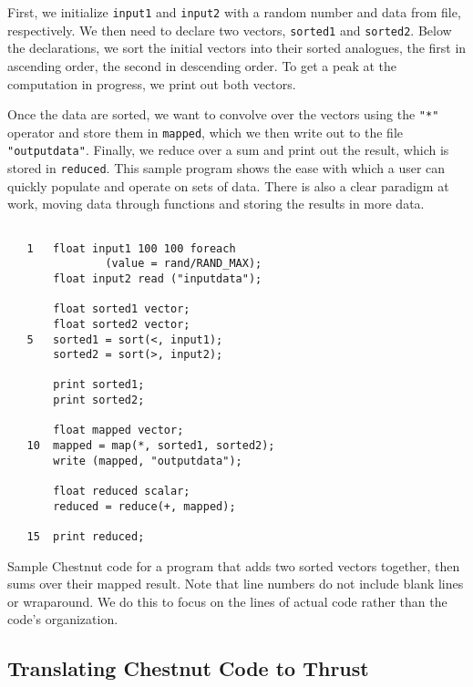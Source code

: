 \documentclass[twocolumn]{article}
\renewcommand{\|}{\origbar} %
\newcommand{\code}[1]{\texttt{#1}}
\begin{document}
First, we initialize \code{input1} and \code{input2} with a random number and data from file, respectively. We then need to declare two vectors, \code{sorted1} and \code{sorted2}. Below the declarations, we sort the initial vectors into their sorted analogues, the first in ascending order, the second in descending order. To get a peak at the computation in progress, we print out both vectors.

Once the data are sorted, we want to convolve over the vectors using the \code{"*"} operator and store them in \code{mapped}, which we then write out to the file \code{"outputdata"}. Finally, we reduce over a sum and print out the result, which is stored in \code{reduced}. This sample program shows the ease with which a user can quickly populate and operate on sets of data. There is also a clear paradigm at work, moving data through functions and storing the results in more data.

\begin{Code Snippet}
\begin{verbatim}

   1   float input1 100 100 foreach 
               (value = rand/RAND_MAX);
       float input2 read ("inputdata");
   
       float sorted1 vector;
       float sorted2 vector;
   5   sorted1 = sort(<, input1);
       sorted2 = sort(>, input2);
   
       print sorted1;
       print sorted2;
   
       float mapped vector;
   10  mapped = map(*, sorted1, sorted2);
       write (mapped, "outputdata");
     
       float reduced scalar;
       reduced = reduce(+, mapped);
   
   15  print reduced;
\end{verbatim}
\caption{Sample Chestnut code for a program that adds two sorted vectors together, then sums over their mapped result. Note that line numbers do not include blank lines or wraparound. We do this to focus on the lines of actual code rather than the code's organization.}
\label{code:fullprog}
\end{Code Snippet}

\subsection{Translating Chestnut Code to Thrust}
\label{sec:chestnutToThrust}
\end{document}
